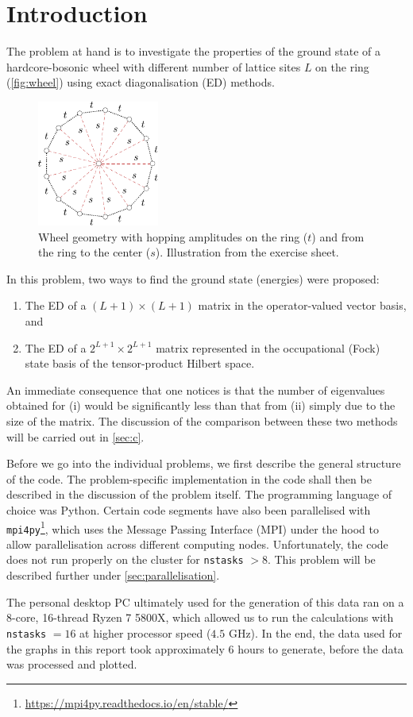 \section{Introduction}

The problem at hand is to investigate the properties of the ground state of a hardcore-bosonic wheel with different number of lattice sites $L$ on the ring (\autoref{fig:wheel}) using exact diagonalisation (ED) methods. 

\begin{figure}
    \centering
    \includegraphics[width=4cm]{graphics/wheel.pdf}
    \caption{Wheel geometry with hopping amplitudes on the ring ($t$) and from the ring to the center ($s$). Illustration from the exercise sheet.}
    \label{fig:wheel}
    \vspace{-1cm}
\end{figure}

In this problem, two ways to find the ground state (energies) were proposed:
\begin{enumerate}[label=(\roman*)]
    \item The ED of a $(L+1)\times(L+1)$ matrix in the operator-valued vector basis, and
    \item The ED of a $2^{L+1}\times2^{L+1}$ matrix represented in the occupational (Fock) state basis of the tensor-product Hilbert space. 
\end{enumerate}

An immediate consequence that one notices is that the number of eigenvalues obtained for (i) would be significantly less than that from (ii) simply due to the size of the matrix. The discussion of the comparison between these two methods will be carried out in \autoref{sec:c}.

Before we go into the individual problems, we first describe the general structure of the code. The problem-specific implementation in the code shall then be described in the discussion of the problem itself. The programming language of choice was Python. Certain code segments have also been parallelised with \texttt{mpi4py}\footnote{\url{https://mpi4py.readthedocs.io/en/stable/}}, which uses the Message Passing Interface (MPI) under the hood to allow parallelisation across different computing nodes. Unfortunately, the code does not run properly on the cluster for \texttt{nstasks} $> 8$. This problem will be described further under \autoref{sec:parallelisation}. 

The personal desktop PC ultimately used for the generation of this data ran on a 8-core, 16-thread Ryzen 7 5800X, which allowed us to run the calculations with \texttt{nstasks} $= 16$ at higher processor speed ($4.5$ GHz). In the end, the data used for the graphs in this report took approximately 6 hours to generate, before the data was processed and plotted.


